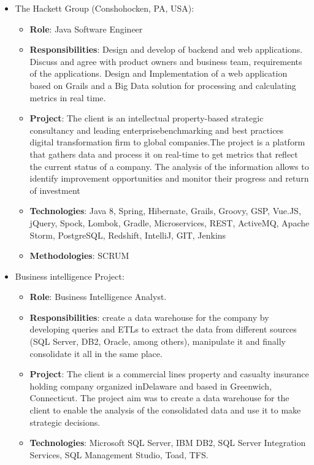 \documentclass[11pt,a4paper,sans]{moderncv}        %
\begin{document}
  {
    \begin{itemize}
      \item The Hackett Group (Conshohocken, PA, USA):
        \begin{itemize}
          \item \textbf{Role}: Java Software Engineer
          \item \textbf{Responsibilities}: Design and develop of backend and web applications.
		Discuss and agree with product owners and business team, requirements of the applications. Design and Implementation of a web application based on Grails and a Big Data solution for processing and calculating metrics in real time.
          \item \textbf{Project}: The client is an intellectual property-based strategic consultancy and leading enterprisebenchmarking and best practices digital transformation firm to global companies.The project is a platform that gathers data and process it on real-time to get metrics that reflect the current status of a company. 
          The analysis of the information allows to identify improvement opportunities and monitor their progress and return of investment
          \item \textbf{Technologies}: Java 8, Spring, Hibernate, Grails, Groovy, GSP, Vue.JS, jQuery, Spock, Lombok, Gradle, Microservices, REST, ActiveMQ, Apache Storm, PostgreSQL, Redshift, IntelliJ, GIT, Jenkins
          \item \textbf{Methodologies}: SCRUM
        \end{itemize}
    \end{itemize}
  }

\vspace{10mm}

  {
    \begin{itemize}
      \item Business intelligence Project:
        \begin{itemize}
          \item \textbf{Role}: Business Intelligence Analyst. 
          \item \textbf{Responsibilities}: create a data warehouse for the company by developing queries and ETLs to extract the data from different sources (SQL Server, DB2, Oracle, among others), manipulate it and finally consolidate it all in the same place.
          \item \textbf{Project}: The client is a commercial lines property and casualty insurance holding company organized inDelaware and based in Greenwich, Connecticut. The project aim was to create a data warehouse for the client to enable the analysis of the consolidated data and use it to make strategic decisions.
          \item \textbf{Technologies}:  Microsoft SQL Server, IBM DB2, SQL Server Integration Services, SQL Management Studio, Toad, TFS.
        \end{itemize}
    \end{itemize}
  }
\end{document}
